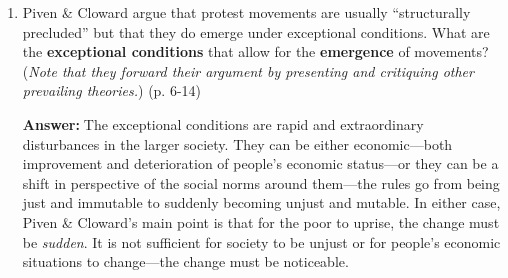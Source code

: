 \documentclass{article}
\newcommand{\answer}{\textbf{Answer:}$\;$}
\begin{document}
\begin{enumerate}[label=\arabic*)]
    \answer
    The authors give two criteria for the transformation in behavior:

    \begin{enumerate}
        \item Masses of people must become defiant. 
        In other words, a large number of people must break and challenge the traditions and laws that they generally follow.
        \item The defiance of people must be acted out as a collective.
        These can come in the form of riots and protests.
        However, they can also be individual acts, so long as the actors perceive themselves to be part of a larger group with which they share a common set of protest beliefs.
    \end{enumerate}

    \item Piven \& Cloward argue that protest movements are usually ``structurally precluded'' but that they do emerge under exceptional conditions.
    What are the \textbf{exceptional conditions} that allow for the \textbf{emergence} of movements?
    (\textit{Note that they forward their argument by presenting and critiquing other prevailing theories.}) (p. 6-14) 

    \answer The exceptional conditions are rapid and extraordinary disturbances in the larger society.
    They can be either economic---both improvement and deterioration of people's economic status---or they can be a shift in perspective of the social norms around them---the rules go from being just and immutable to suddenly becoming unjust and mutable.
    In either case, Piven \& Cloward's main point is that for the poor to uprise, the change must be \textit{sudden}.
    It is not sufficient for society to be unjust or for people's economic situations to change---the change must be noticeable.
    
\end{enumerate}
 
\end{document}
